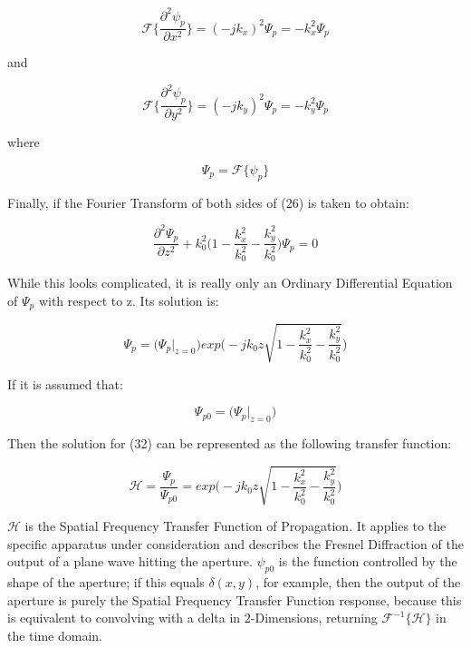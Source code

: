 \documentclass[12pt]{article}
\begin{document}
\begin{equation}
	\mathscr{F} \Big\{ \frac{\partial^2 \psi_{p}}{\partial x^2} \Big\} = (-jk_{x})^2\Psi_{p} = -k_{x}^2\Psi_{p}
\end{equation}

and

\begin{equation}
	\mathscr{F} \Big\{ \frac{\partial^2 \psi_{p}}{\partial y^2} \Big\} = (-jk_{y})^2\Psi_{p} = -k_{y}^2\Psi_{p}
\end{equation}

where

\begin{equation}
	\Psi_{p} = \mathscr{F} \{\psi_{p}\}
\end{equation}

Finally, if the Fourier Transform of both sides of (26) is taken to obtain:

\begin{equation}
	\frac{\partial^2\Psi_{p}}{\partial z^2} + k_{0}^{2} \bigg ( 1 - \frac{k_{x}^2}{k_{0}^2} - \frac{k_{y}^2}{k_{0}^2} \bigg ) \Psi_{p} = 0
\end{equation}

While this looks complicated, it is really only an Ordinary Differential Equation of \(\Psi_{p}\) with respect to z. Its solution is:

\begin{equation}
	\Psi_{p} = \big(\Psi_{p}\vert_{z = 0}\big) exp\Bigg(-jk_{0}z\sqrt{1 - \frac{k_{x}^2}{k_{0}^2} - \frac{k_{y}^2}{k_{0}^2}}\Bigg)
\end{equation}

If it is assumed that:

\begin{equation}
	\Psi_{p0} = \big(\Psi_{p}\vert_{z = 0}\big)
\end{equation}

Then the solution for (32) can be represented as the following transfer function:

\begin{equation}
	\mathscr{H} = \frac{\Psi_{p}}{\Psi_{p0}} = exp\Bigg(-jk_{0}z\sqrt{1 - \frac{k_{x}^2}{k_{0}^2} - \frac{k_{y}^2}{k_{0}^2}}\Bigg)
\end{equation}

\(\mathscr{H}\) is the Spatial Frequency Transfer Function of Propagation. It applies to the specific apparatus under consideration and describes the Fresnel Diffraction of the output of a plane wave hitting the aperture. \(\psi_{p0}\) is the function controlled by the shape of the aperture; if this equals \(\delta(x,y)\), for example, then the output of the aperture is purely the Spatial Frequency Transfer Function response, because this is equivalent to convolving with a delta in 2-Dimensions, returning \(\mathscr{F}^{-1} \{\mathscr{H}\} \) in the time domain.
\end{document}
